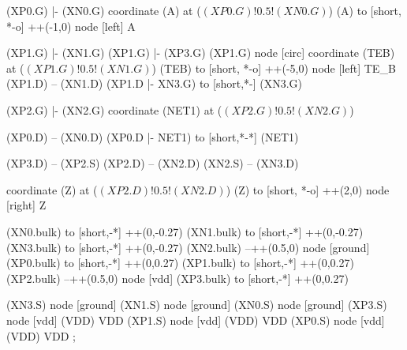 \begin{circuitikz}[american]

	(XP0.G)	|- (XN0.G)
	coordinate (A) at ($(XP0.G)!0.5!(XN0.G)$)
	(A) to [short, *-o] ++(-1,0) node [left] {A}
	
	(XP1.G) |- (XN1.G)
	(XP1.G) |- (XP3.G)
	(XP1.G) node [circ]{}
	coordinate (TEB) at ($(XP1.G)!0.5!(XN1.G)$)
	(TEB) to [short, *-o] ++(-5,0) node [left] {TE\_B}
	(XP1.D) -- (XN1.D)
	(XP1.D |- XN3.G) to [short,*-] (XN3.G)

	(XP2.G) |- (XN2.G)
	coordinate (NET1) at ($(XP2.G)!0.5!(XN2.G)$)
	
	(XP0.D) -- (XN0.D)
	(XP0.D |- NET1) to [short,*-*] (NET1)
	
	(XP3.D) -- (XP2.S)
	(XP2.D) -- (XN2.D)
	(XN2.S) -- (XN3.D)

	coordinate (Z) at ($(XP2.D)!0.5!(XN2.D)$)
	(Z) to [short, *-o] ++(2,0) node [right] {Z}
	
	(XN0.bulk) to [short,-*] ++(0,-0.27)	
	(XN1.bulk) to [short,-*] ++(0,-0.27)
	(XN3.bulk) to [short,-*] ++(0,-0.27)
	(XN2.bulk) --++(0.5,0) node [ground]{}	
	(XP0.bulk) to [short,-*] ++(0,0.27)	
	(XP1.bulk) to [short,-*] ++(0,0.27)		
	(XP2.bulk) --++(0.5,0) node [vdd]{}
	(XP3.bulk) to [short,-*] ++(0,0.27)	


	(XN3.S) node [ground] {}
	(XN1.S) node [ground] {}
	(XN0.S) node [ground] {}
	(XP3.S) node [vdd] (VDD) {VDD}
	(XP1.S) node [vdd] (VDD) {VDD}
	(XP0.S) node [vdd] (VDD) {VDD}
;

\end{circuitikz}
